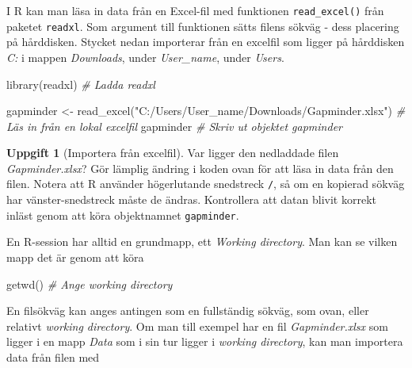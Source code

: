 \documentclass[
]{book}
\newenvironment{Shaded}{\begin{snugshade}}{\end{snugshade}}
\newcommand{\CommentTok}[1]{\textcolor[rgb]{0.56,0.35,0.01}{\textit{#1}}}
\newcommand{\FunctionTok}[1]{\textcolor[rgb]{0.00,0.00,0.00}{#1}}
\newcommand{\NormalTok}[1]{#1}
\newcommand{\OtherTok}[1]{\textcolor[rgb]{0.56,0.35,0.01}{#1}}
\newcommand{\StringTok}[1]{\textcolor[rgb]{0.31,0.60,0.02}{#1}}
\theoremstyle{definition}
\theoremstyle{definition}
\theoremstyle{definition}
\newtheorem{exercise}{Uppgift}[chapter]
\theoremstyle{definition}
\theoremstyle{remark}
\begin{document}
I R kan man läsa in data från en Excel-fil med funktionen \texttt{read\_excel()} från paketet \texttt{readxl}. Som argument till funktionen sätts filens sökväg - dess placering på hårddisken. Stycket nedan importerar från en excelfil som ligger på hårddisken \emph{C:} i mappen \emph{Downloads}, under \emph{User\_name}, under \emph{Users}.

\begin{Shaded}
\begin{Highlighting}[]
\FunctionTok{library}\NormalTok{(readxl)                                                           }\CommentTok{\# Ladda readxl}
\end{Highlighting}
\end{Shaded}

\begin{Shaded}
\begin{Highlighting}[]
\NormalTok{gapminder }\OtherTok{\textless{}{-}} \FunctionTok{read\_excel}\NormalTok{(}\StringTok{"C:/Users/User\_name/Downloads/Gapminder.xlsx"}\NormalTok{)    }\CommentTok{\# Läs in från en lokal excelfil}
\NormalTok{gapminder                                                                 }\CommentTok{\# Skriv ut objektet gapminder}
\end{Highlighting}
\end{Shaded}

\begin{exercise}[Importera från excelfil]
Var ligger den nedladdade filen \emph{Gapminder.xlsx}? Gör lämplig ändring i koden ovan för att läsa in data från den filen. Notera att R använder högerlutande snedstreck \texttt{/}, så om en kopierad sökväg har vänster-snedstreck måste de ändras. Kontrollera att datan blivit korrekt inläst genom att köra objektnamnet \texttt{gapminder}.
\end{exercise}

En R-session har alltid en grundmapp, ett \emph{Working directory}. Man kan se vilken mapp det är genom att köra

\begin{Shaded}
\begin{Highlighting}[]
\FunctionTok{getwd}\NormalTok{()                                }\CommentTok{\# Ange working directory}
\end{Highlighting}
\end{Shaded}

En filsökväg kan anges antingen som en fullständig sökväg, som ovan, eller relativt \emph{working directory}. Om man till exempel har en fil \emph{Gapminder.xlsx} som ligger i en mapp \emph{Data} som i sin tur ligger i \emph{working directory}, kan man importera data från filen med
\end{document}
